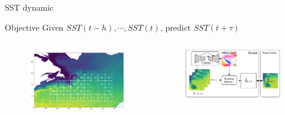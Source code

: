 \documentclass[handout]{beamer}
\newcommand{\rref}[1][]{\hfill{\scriptsize\textit{#1}}}
\begin{document}
\begin{frame}{SST dynamic}
    \rref[\cite{DeBezenac2017TowardsModeling}]
    \begin{block}{Objective}
    Given $SST(t-h),\cdots,SST(t)$, predict $SST(t+\tau)$
    \end{block}
    \begin{columns}
    \begin{figure}
        \centering
        \includegraphics[width=\textwidth]{fig/L3/sst-map.png}
    \end{figure}
    \pause
   \begin{figure}
        \centering
        \includegraphics[width=\textwidth]{fig/L3/sst-nn-scheme.png}
    \end{figure}
        \end{columns}

\end{frame}
\end{document}
